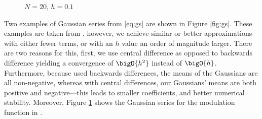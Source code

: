 \begin{figure}[tbp]

\caption{$N = 20$, $h = 0.1$}
\label{fig:gaussmod}
\end{figure}

Two examples of Gaussian series from \eqref{eq:gs} are shown in Figure \ref{fig:gs}. These examples are taken from \cite{calcaterra2, calcaterra}, however, we achieve similar or better approximations with either fewer terms, or with an $h$ value an order of magnitude larger. There are two reasons for this, first, we use central difference as opposed to backwards difference yielding a convergence of $\bigO{h^2}$ instead of $\bigO{h}$. Furthermore, because \cite{calcaterra2, calcaterra} used backwards differences, the means of the Gaussians are all non-negative, whereas with central differences, our Gaussians' means are both positive and negative---this leads to smaller coefficients, and better numerical stability. Moreover, Figure \ref{fig:gaussmod} shows the Gaussian series for the modulation function in \cite{bohun, burgoyneemail}.

